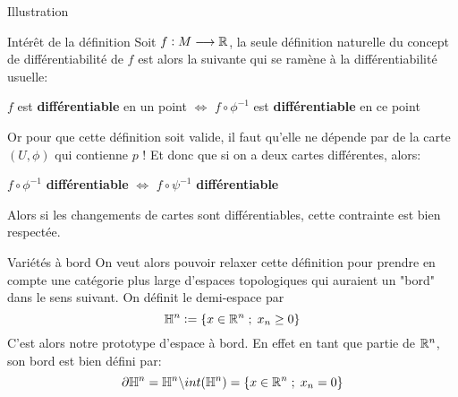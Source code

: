 \documentclass{beamer}
\begin{document}
\begin{frame}{Illustration}
\begin{figure}[H]
             \end{figure} 
        \end{frame}
        \begin{frame}{Intérêt de la définition}
            Soit $f : M \longrightarrow \mathbb{R}$, la seule définition naturelle du concept de différentiabilité de $f$ est alors la suivante qui se ramène à la différentiabilité usuelle:
            \begin{center}
                \( f \) est \textbf{différentiable} en un point $\iff$ \( f \circ \phi^{-1} \) est \textbf{différentiable} en ce point
            \end{center}
            Or pour que cette définition soit valide, il faut qu'elle ne dépende par de la carte $(U, \phi)$ qui contienne $p$ ! Et donc que si on a deux cartes différentes, alors:
            \begin{center}
                \( f \circ \phi^{-1} \) \textbf{différentiable} $\iff$ \( f \circ \psi^{-1} \) \textbf{différentiable}
            \end{center}
            Alors si les changements de cartes sont différentiables, cette contrainte est bien respectée.

        \end{frame}
        \begin{frame}{Variétés à bord}
            On veut alors pouvoir relaxer cette définition pour prendre en compte une catégorie plus large d’espaces topologiques qui auraient un "bord" dans le sens suivant. On définit le demi-espace par 
            $$
                \mathbb{H}^n := \left\{ x \in \mathbb{R}^n  \; ; \; x_n \geq 0\right\}
            $$
            C'est alors notre prototype d'espace à bord. En effet en tant que partie de $\mathbb{R}^n$, son bord est bien défini par:
            \[
                \partial \mathbb{H}^n = \mathbb{H}^n \backslash int(\mathbb{H}^n) = \left\{ x \in \mathbb{R}^n  \; ; \; x_n = 0\right\}
            \]
        \end{frame}      
\end{document}
